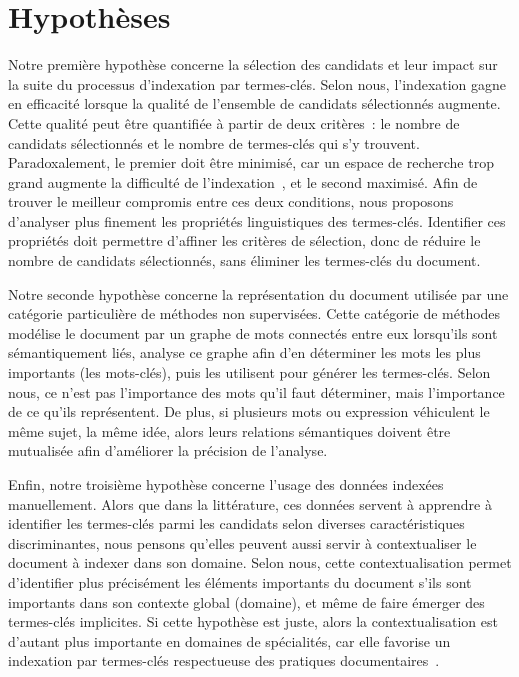 
  \section{Hypothèses}
  \label{sec:main-introduction-hypothesis}
    Notre première hypothèse concerne la sélection des candidats et leur impact
    sur la suite du processus d'indexation par termes-clés. Selon nous,
    l'indexation gagne en efficacité lorsque la qualité de l'ensemble de
    candidats sélectionnés augmente. Cette qualité peut être quantifiée à partir
    de deux critères~: le nombre de candidats sélectionnés et le nombre de
    termes-clés qui s'y trouvent. Paradoxalement, le premier doit être minimisé,
    car un espace de recherche trop grand augmente la difficulté de
    l'indexation~\cite{hasan2014state_of_the_art}, et le second maximisé. Afin
    de trouver le meilleur compromis entre ces deux conditions, nous proposons
    d'analyser plus finement les propriétés linguistiques des termes-clés.
    Identifier ces propriétés doit permettre d'affiner les critères de
    sélection, donc de réduire le nombre de candidats sélectionnés, sans
    éliminer les termes-clés du document.
    
    Notre seconde hypothèse concerne la représentation du document utilisée par
    une catégorie particulière de méthodes non supervisées. Cette catégorie de
    méthodes modélise le document par un graphe de mots connectés entre eux
    lorsqu'ils sont sémantiquement liés, analyse ce graphe afin d'en déterminer
    les mots les plus importants (les mots-clés), puis les utilisent pour
    générer les termes-clés. Selon nous, ce n'est pas l'importance des mots
    qu'il faut déterminer, mais l'importance de ce qu'ils représentent. De plus,
    si plusieurs mots ou expression véhiculent le même sujet, la même idée,
    alors leurs relations sémantiques doivent être mutualisée afin d'améliorer
    la précision de l'analyse.
    
    Enfin, notre troisième hypothèse concerne l'usage des données indexées
    manuellement. Alors que dans la littérature, ces données servent à apprendre
    à identifier les termes-clés parmi les candidats selon diverses
    caractéristiques discriminantes, nous pensons qu'elles peuvent aussi servir
    à contextualiser le document à indexer dans son domaine. Selon nous, cette
    contextualisation permet d'identifier plus précisément les éléments
    importants du document s'ils sont importants dans son contexte global
    (domaine), et même de faire émerger des termes-clés implicites. Si cette
    hypothèse est juste, alors la contextualisation est d'autant plus importante
    en domaines de spécialités, car elle favorise un indexation par termes-clés
    respectueuse des pratiques
    documentaires~\cite{guinchat1996techniquesdocumentaires}.


